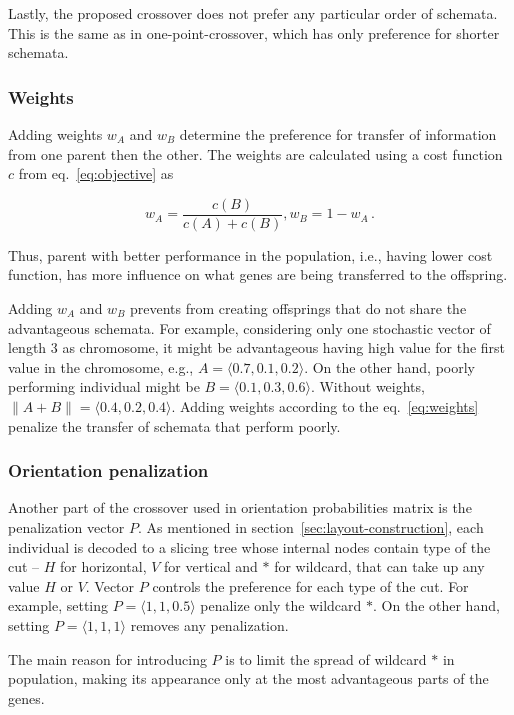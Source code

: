 Lastly, the proposed crossover does not prefer any particular order of schemata.
This is the same as in one-point-crossover, which has only preference for shorter schemata.


\subsubsection*{Weights}
Adding weights $w_A$ and $w_B$ determine the preference for transfer of information from one parent then the other.
The weights are calculated using a cost function $c$ from eq.~\ref{eq:objective} as

\begin{equation}
    w_A = \dfrac{c(B)}{c(A)+{c(B)}}, w_B = 1 - w_A\,.
    \label{eq:weights}
\end{equation}

Thus, parent with better performance in the population, i.e., having lower cost function,
has more influence on what genes are being transferred to the offspring.

Adding $w_A$ and $w_B$ prevents from creating offsprings that do not share the advantageous schemata.
For example, considering only one stochastic vector of length 3 as chromosome,
it might be advantageous having high value for the first value in the chromosome, e.g., $A=\langle 0.7, 0.1, 0.2 \rangle$.
On the other hand, poorly performing individual might be $B=\langle 0.1, 0.3, 0.6 \rangle$.
Without weights, $\| A+B\| = \langle 0.4, 0.2 , 0.4 \rangle$.
Adding weights according to the eq.~\ref{eq:weights} penalize the transfer of schemata that perform poorly.

\subsubsection*{Orientation penalization}

Another part of the crossover used in orientation probabilities matrix is the penalization vector $P$.
As mentioned in section~\ref{sec:layout-construction}, each individual is decoded to a slicing tree
whose internal nodes contain type of the cut – $H$ for horizontal, $V$ for vertical
and $*$ for wildcard, that can take up any value $H$ or $V$.
Vector $P$ controls the preference for each type of the cut.
For example, setting $P= \langle 1,1,0.5 \rangle$ penalize only the wildcard $*$.
On the other hand, setting $P= \langle 1,1,1 \rangle$ removes any penalization.

The main reason for introducing $P$ is to limit the spread of wildcard $*$ in population,
making its appearance only at the most advantageous parts of the genes.

